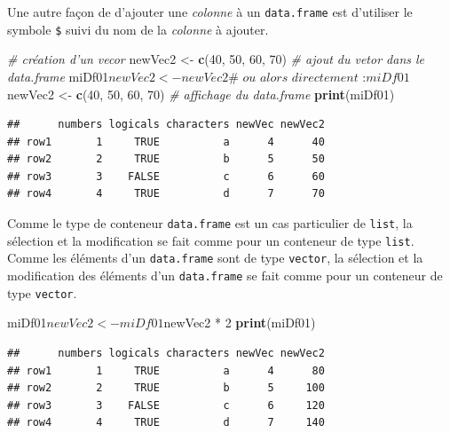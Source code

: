 \documentclass[twoside,symmetric]{book}
\newenvironment{Shaded}{}{}
\newcommand{\CommentTok}[1]{\textit{#1}}
\newcommand{\DecValTok}[1]{#1}
\newcommand{\KeywordTok}[1]{\textbf{#1}}
\newcommand{\NormalTok}[1]{#1}
\newcommand{\OperatorTok}[1]{#1}
\newcommand{\StringTok}[1]{#1}
\begin{document}
Une autre façon de d'ajouter une \emph{colonne} à un \texttt{data.frame} est d'utiliser le symbole \texttt{\$} suivi du nom de la \emph{colonne} à ajouter.

\begin{Shaded}
\begin{Highlighting}[]
\CommentTok{# création d'un vecor}
\NormalTok{newVec2 <-}\StringTok{ }\KeywordTok{c}\NormalTok{(}\DecValTok{40}\NormalTok{, }\DecValTok{50}\NormalTok{, }\DecValTok{60}\NormalTok{, }\DecValTok{70}\NormalTok{)}
\CommentTok{# ajout du vetor dans le data.frame}
\NormalTok{miDf01}\OperatorTok{$}\NormalTok{newVec2 <-}\StringTok{ }\NormalTok{newVec2}
\CommentTok{# ou alors directement :}
\NormalTok{miDf01}\OperatorTok{$}\NormalTok{newVec2 <-}\StringTok{ }\KeywordTok{c}\NormalTok{(}\DecValTok{40}\NormalTok{, }\DecValTok{50}\NormalTok{, }\DecValTok{60}\NormalTok{, }\DecValTok{70}\NormalTok{)}
\CommentTok{# affichage du data.frame}
\KeywordTok{print}\NormalTok{(miDf01)}
\end{Highlighting}
\end{Shaded}

\begin{verbatim}
##      numbers logicals characters newVec newVec2
## row1       1     TRUE          a      4      40
## row2       2     TRUE          b      5      50
## row3       3    FALSE          c      6      60
## row4       4     TRUE          d      7      70
\end{verbatim}

Comme le type de conteneur \texttt{data.frame} est un cas particulier de \texttt{list}, la sélection et la modification se fait comme pour un conteneur de type \texttt{list}. Comme les éléments d'un \texttt{data.frame} sont de type \texttt{vector}, la sélection et la modification des éléments d'un \texttt{data.frame} se fait comme pour un conteneur de type \texttt{vector}.

\begin{Shaded}
\begin{Highlighting}[]
\NormalTok{miDf01}\OperatorTok{$}\NormalTok{newVec2 <-}\StringTok{ }\NormalTok{miDf01}\OperatorTok{$}\NormalTok{newVec2 }\OperatorTok{*}\StringTok{ }\DecValTok{2}
\KeywordTok{print}\NormalTok{(miDf01)}
\end{Highlighting}
\end{Shaded}

\begin{verbatim}
##      numbers logicals characters newVec newVec2
## row1       1     TRUE          a      4      80
## row2       2     TRUE          b      5     100
## row3       3    FALSE          c      6     120
## row4       4     TRUE          d      7     140
\end{verbatim}
\end{document}
